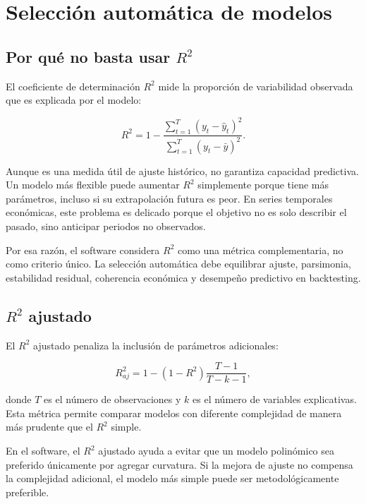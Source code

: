 \section{Selección automática de modelos}

\subsection{Por qué no basta usar \(R^2\)}

El coeficiente de determinación \(R^2\) mide la proporción de variabilidad observada que es explicada por el modelo:

\begin{equation}
    R^2 = 1 - \frac{\sum_{t=1}^{T}(y_t-\hat{y}_t)^2}{\sum_{t=1}^{T}(y_t-\bar{y})^2}.
    \label{eq:r2}
\end{equation}

Aunque es una medida útil de ajuste histórico, no garantiza capacidad predictiva. Un modelo más flexible puede aumentar \(R^2\) simplemente porque tiene más parámetros, incluso si su extrapolación futura es peor. En series temporales económicas, este problema es delicado porque el objetivo no es solo describir el pasado, sino anticipar periodos no observados.

Por esa razón, el software considera \(R^2\) como una métrica complementaria, no como criterio único. La selección automática debe equilibrar ajuste, parsimonia, estabilidad residual, coherencia económica y desempeño predictivo en backtesting.

\subsection{\(R^2\) ajustado}

El \(R^2\) ajustado penaliza la inclusión de parámetros adicionales:

\begin{equation}
    R^2_{aj} = 1 - (1-R^2)\frac{T-1}{T-k-1},
    \label{eq:r2_ajustado}
\end{equation}

donde \(T\) es el número de observaciones y \(k\) es el número de variables explicativas. Esta métrica permite comparar modelos con diferente complejidad de manera más prudente que el \(R^2\) simple.

En el software, el \(R^2\) ajustado ayuda a evitar que un modelo polinómico sea preferido únicamente por agregar curvatura. Si la mejora de ajuste no compensa la complejidad adicional, el modelo más simple puede ser metodológicamente preferible.

